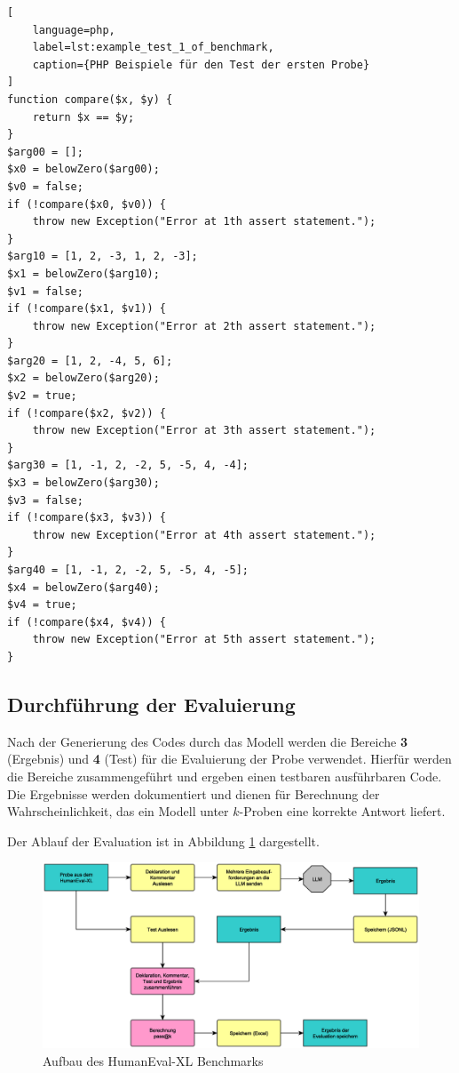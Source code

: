 \begin{lstlisting}[
	language=php,
	label=lst:example_test_1_of_benchmark,
	caption={PHP Beispiele für den Test der ersten Probe}
]
function compare($x, $y) {
	return $x == $y;
}
$arg00 = [];
$x0 = belowZero($arg00);
$v0 = false;
if (!compare($x0, $v0)) {
	throw new Exception("Error at 1th assert statement.");
}
$arg10 = [1, 2, -3, 1, 2, -3];
$x1 = belowZero($arg10);
$v1 = false;
if (!compare($x1, $v1)) {
	throw new Exception("Error at 2th assert statement.");
}
$arg20 = [1, 2, -4, 5, 6];
$x2 = belowZero($arg20);
$v2 = true;
if (!compare($x2, $v2)) {
	throw new Exception("Error at 3th assert statement.");
}
$arg30 = [1, -1, 2, -2, 5, -5, 4, -4];
$x3 = belowZero($arg30);
$v3 = false;
if (!compare($x3, $v3)) {
	throw new Exception("Error at 4th assert statement.");
}
$arg40 = [1, -1, 2, -2, 5, -5, 4, -5];
$x4 = belowZero($arg40);
$v4 = true;
if (!compare($x4, $v4)) {
	throw new Exception("Error at 5th assert statement.");
}
\end{lstlisting}

\subsection{Durchführung der Evaluierung}
Nach der Generierung des Codes durch das Modell werden die Bereiche \textbf{3} (Ergebnis) und \textbf{4} (Test) für die Evaluierung der Probe verwendet. Hierfür werden die Bereiche zusammengeführt und ergeben einen testbaren ausführbaren Code. Die Ergebnisse werden dokumentiert und dienen für Berechnung der Wahrscheinlichkeit, das ein Modell unter $k$-Proben eine korrekte Antwort liefert.\vspace{0.2cm}

Der Ablauf der Evaluation ist in Abbildung \ref{img:sequence_of_evaluation} dargestellt.\vspace{0.2cm}

\begin{figure}[!ht]
	\includegraphics[width=\textwidth]{content/chapter_concept_design/images/ablauf_evaluation.eps}
	\centering
	\caption{Aufbau des HumanEval-XL Benchmarks}
	\label{img:sequence_of_evaluation}
\end{figure}



